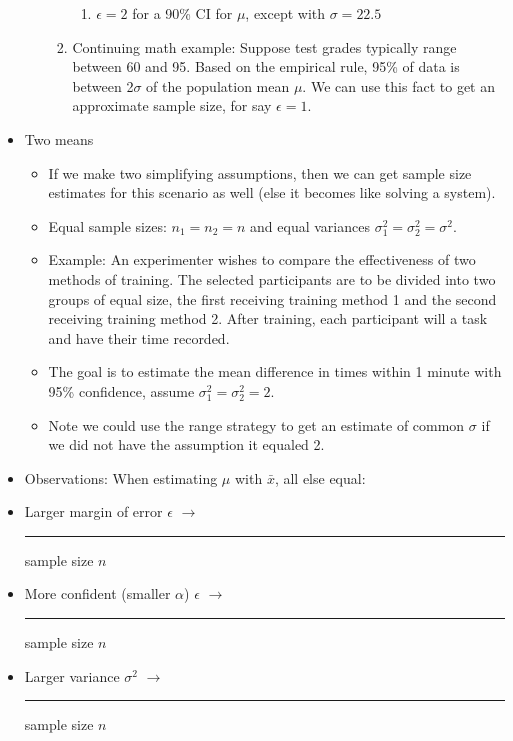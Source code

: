 \documentclass{article}
\newcommand{\blankul}[1]{\rule[-1.5mm]{#1}{0.15mm}}	%
\begin{document}
\begin{itemize}
\begin{itemize}
\begin{enumerate}
\begin{enumerate}
                \item $\epsilon = 2$ for a 90\% CI for $\mu$, except with $\sigma = 22.5$\vspace{40pt}
            \end{enumerate}
            \item Continuing math example: Suppose test grades typically range between 60 and 95. Based on the empirical rule, 95\% of data is between 2$\sigma$ of the population mean $\mu$. We can use this fact to get an approximate sample size, for say $\epsilon = 1$.\vspace{100pt}
        \end{enumerate}
    \end{itemize}\bigskip
    \item Two means\bigskip
    \begin{itemize}
        \item If we make two simplifying assumptions, then we can get sample size estimates for this scenario as well (else it becomes like solving a system).
        \item[] Equal sample sizes: $n_1 = n_2 = n$ and equal variances $\sigma^2_1 = \sigma^2_2 = \sigma^2$.\vspace{100pt}\newpage
        \item Example: An experimenter wishes to compare the effectiveness of two methods of training. The selected participants are to be divided into two groups of equal size, the first receiving training method 1 and the second receiving training method 2. After training, each participant will a task and have their time recorded.
        \item[] The goal is to estimate the mean difference in times within 1 minute with 95\% confidence, assume $\sigma^2_1 = \sigma^2_2 = 2$.\vspace{60pt}
        \item[] Note we could use the range strategy to get an estimate of common $\sigma$ if we did not have the assumption it equaled 2.
    \end{itemize}\bigskip
    \item Observations: When estimating $\mu$ with $\bar{x}$, all else equal:
    \item[] Larger margin of error $\epsilon$ $\rightarrow$ \blankul{2cm} sample size $n$
    \item[] More confident (smaller $\alpha$) $\epsilon$ $\rightarrow$ \blankul{2cm} sample size $n$
    \item[] Larger variance $\sigma^2$ $\rightarrow$ \blankul{2cm} sample size $n$
\end{itemize}
\end{document}

